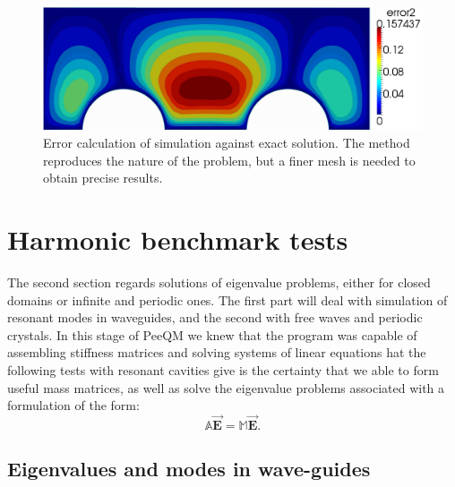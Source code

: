 \begin{figure}
\centering
\includegraphics[scale=0.4]{./img/two_cylinders_error.pdf}
\caption{Error calculation of simulation against exact solution. The method reproduces the nature of the problem, but a finer mesh is needed to obtain precise results.}
\label{fig:two_cylinders_error}
\end{figure}

\section{Harmonic benchmark tests}
The second section regards solutions of eigenvalue problems, either for closed domains or infinite and periodic ones. The first part will deal with simulation of resonant modes in waveguides, and the second with free waves and periodic crystals.   
In this stage of PeeQM we knew that the program was capable of assembling stiffness matrices and solving systems of linear equations hat the following tests with resonant cavities give is the certainty that we  able to form useful mass matrices, as well as solve the eigenvalue problems associated with a formulation of the form:
\[\mathbb{A}\mathbf{\vec{E}} = \mathbb{M}\mathbf{\vec{E}}.\]

\subsection{Eigenvalues and modes in wave-guides}

